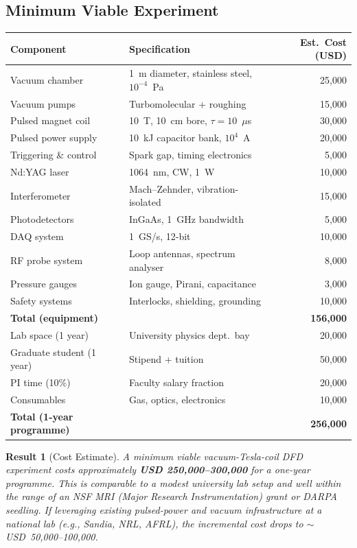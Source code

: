 \documentclass[11pt,a4paper]{article}
\newtheorem{result}{Result}
\begin{document}
\subsection{Minimum Viable Experiment}

\begin{center}
\begin{tabular}{llr}
\toprule
\textbf{Component} & \textbf{Specification} & \textbf{Est.\ Cost (USD)} \\
\midrule
Vacuum chamber & 1~m diameter, stainless steel, $10^{-4}$~Pa & 25,000 \\
Vacuum pumps & Turbomolecular + roughing & 15,000 \\
Pulsed magnet coil & 10~T, 10~cm bore, $\tau = 10$~$\mu$s & 30,000 \\
Pulsed power supply & 10~kJ capacitor bank, $10^4$~A & 20,000 \\
Triggering \& control & Spark gap, timing electronics & 5,000 \\
Nd:YAG laser & 1064~nm, CW, 1~W & 10,000 \\
Interferometer & Mach--Zehnder, vibration-isolated & 15,000 \\
Photodetectors & InGaAs, 1~GHz bandwidth & 5,000 \\
DAQ system & 1~GS/s, 12-bit & 10,000 \\
RF probe system & Loop antennas, spectrum analyser & 8,000 \\
Pressure gauges & Ion gauge, Pirani, capacitance & 3,000 \\
Safety systems & Interlocks, shielding, grounding & 10,000 \\
\midrule
\textbf{Total (equipment)} & & \textbf{156,000} \\
\midrule
Lab space (1 year) & University physics dept.\ bay & 20,000 \\
Graduate student (1 year) & Stipend + tuition & 50,000 \\
PI time (10\%) & Faculty salary fraction & 20,000 \\
Consumables & Gas, optics, electronics & 10,000 \\
\midrule
\textbf{Total (1-year programme)} & & \textbf{256,000} \\
\bottomrule
\end{tabular}
\end{center}

\begin{result}[Cost Estimate]
A minimum viable vacuum-Tesla-coil DFD experiment costs approximately
\textbf{USD 250,000--300,000} for a one-year programme. This is comparable
to a modest university lab setup and well within the range of an NSF MRI
(Major Research Instrumentation) grant or DARPA seedling. If leveraging
existing pulsed-power and vacuum infrastructure at a national lab (e.g.,
Sandia, NRL, AFRL), the incremental cost drops to $\sim$USD~50,000--100,000.
\end{result}
\end{document}

